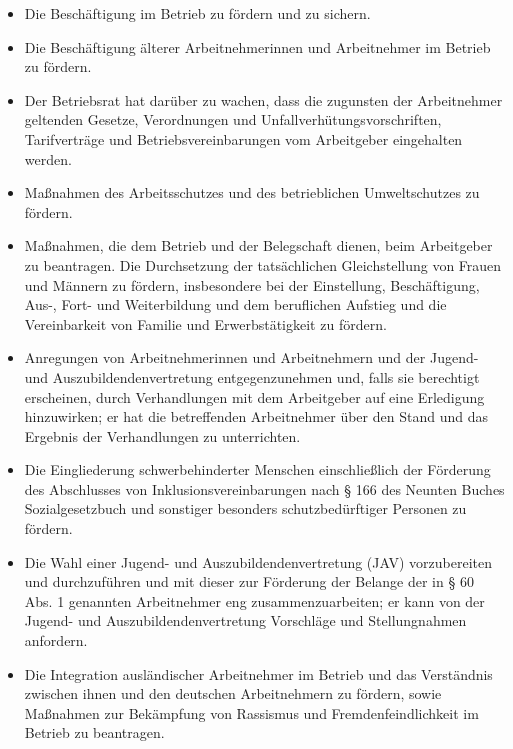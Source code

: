 \begin{itemize}
	\item
	Die Beschäftigung im Betrieb zu fördern und zu sichern.
	\item
	Die Beschäftigung älterer Arbeitnehmerinnen und Arbeitnehmer im Betrieb zu fördern.
	\item 
	Der Betriebsrat hat darüber zu wachen, dass die zugunsten der Arbeitnehmer geltenden Gesetze, Verordnungen und Unfallverhütungsvorschriften, Tarifverträge und Betriebsvereinbarungen vom Arbeitgeber eingehalten werden.
	\item
	Maßnahmen des Arbeitsschutzes und des betrieblichen Umweltschutzes zu fördern.
	\item
	Maßnahmen, die dem Betrieb und der Belegschaft dienen, beim Arbeitgeber zu beantragen. Die Durchsetzung der tatsächlichen Gleichstellung von Frauen und Männern zu fördern, insbesondere bei der Einstellung, Beschäftigung, Aus-, Fort- und Weiterbildung und dem beruflichen Aufstieg und die Vereinbarkeit von Familie und Erwerbstätigkeit zu fördern.
	\item 
	Anregungen von Arbeitnehmerinnen und Arbeitnehmern und der Jugend- und Auszubildendenvertretung entgegenzunehmen und, falls sie berechtigt erscheinen, durch Verhandlungen mit dem Arbeitgeber auf eine Erledigung hinzuwirken; er hat die betreffenden Arbeitnehmer über den Stand und das Ergebnis der Verhandlungen zu unterrichten.
	\item
	Die Eingliederung schwerbehinderter Menschen einschließlich der Förderung des Abschlusses von Inklusionsvereinbarungen nach § 166 des Neunten Buches Sozialgesetzbuch und sonstiger besonders schutzbedürftiger Personen zu fördern.
	\item
	Die Wahl einer Jugend- und Auszubildendenvertretung (JAV) vorzubereiten und durchzuführen und mit dieser zur Förderung der Belange der in § 60 Abs. 1 genannten Arbeitnehmer eng zusammenzuarbeiten; er kann von der Jugend- und Auszubildendenvertretung Vorschläge und Stellungnahmen anfordern.
	\item
	Die Integration ausländischer Arbeitnehmer im Betrieb und das Verständnis zwischen ihnen und den deutschen Arbeitnehmern zu fördern, sowie Maßnahmen zur Bekämpfung von Rassismus und Fremdenfeindlichkeit im Betrieb zu beantragen.
\end{itemize}

